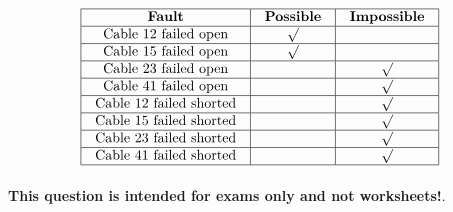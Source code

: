






$$\vbox{\offinterlineskip
\halign{\strut
\vrule \quad\hfil # \ \hfil & 
\vrule \quad\hfil # \ \hfil & 
\vrule \quad\hfil # \ \hfil \vrule \cr
\noalign{\hrule}
%
{\bf Fault} & {\bf Possible} & {\bf Impossible} \cr
%
\noalign{\hrule}
%
Cable 12 failed open & $\surd$ &  \cr
%
\noalign{\hrule}
%
Cable 15 failed open & $\surd$ &  \cr
%
\noalign{\hrule}
%
Cable 23 failed open &  & $\surd$ \cr
%
\noalign{\hrule}
%
Cable 41 failed open &  & $\surd$ \cr
%
\noalign{\hrule}
%
Cable 12 failed shorted &  & $\surd$ \cr
%
\noalign{\hrule}
%
Cable 15 failed shorted &  & $\surd$ \cr
%
\noalign{\hrule}
%
Cable 23 failed shorted &  & $\surd$ \cr
%
\noalign{\hrule}
%
Cable 41 failed shorted &  & $\surd$ \cr
%
\noalign{\hrule}
} %
}$$ %







{\bf This question is intended for exams only and not worksheets!}.



